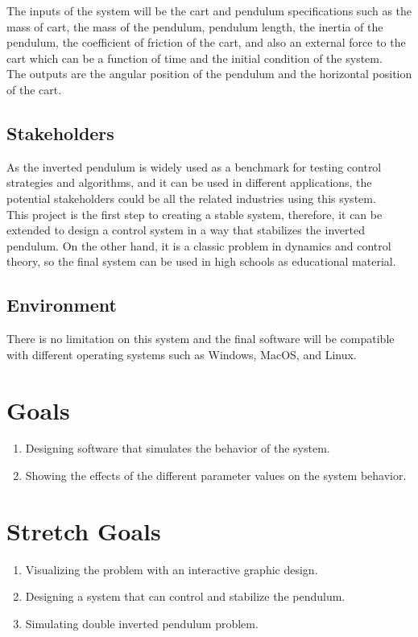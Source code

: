 \documentclass{article}
\begin{document}
The inputs of the system will be the cart and pendulum specifications such as the mass of cart, the mass of the pendulum, pendulum length, the inertia of the pendulum, the coefficient of friction of the cart, and also an external force to the cart which can be a function of time and the initial condition of the system.\\
The outputs are the angular position of the pendulum and the horizontal position of the cart.

\subsection{Stakeholders}

As the inverted pendulum is widely used as a benchmark for testing control strategies and algorithms, and it can be used in different applications, the potential stakeholders could be all the related industries using this system.\\
This project is the first step to creating a stable system, therefore, it can be extended to design a control system in a way that stabilizes the inverted pendulum. On the other hand, it is a classic problem in dynamics and control theory, so the final system can be used in high schools as educational material.

\subsection{Environment}

There is no limitation on this system and the final software will be compatible with different operating systems such as Windows, MacOS, and Linux.

\section{Goals}

\begin{enumerate}
  \item Designing software that simulates the behavior of the system.
  \item Showing the effects of the different parameter values on the system behavior.
\end{enumerate}
\section{Stretch Goals}
\begin{enumerate}
  \item Visualizing the problem with an interactive graphic design.
  \item Designing a system that can control and stabilize the pendulum.
  \item Simulating double inverted pendulum problem.
\end{enumerate}
\end{document}
